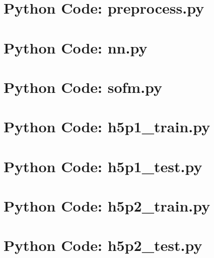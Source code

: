 \documentclass[11pt,titlepage]{article}
\begin{document}
\newpage
\begin{appendices}
\section{Python Code: preprocess.py}


\newpage
\section{Python Code: nn.py}


\newpage
\section{Python Code: sofm.py}


\newpage
\section{Python Code: h5p1\_train.py}


\newpage
\section{Python Code: h5p1\_test.py}


\newpage
\section{Python Code: h5p2\_train.py}


\newpage
\section{Python Code: h5p2\_test.py}


\end{appendices}
\end{document}
